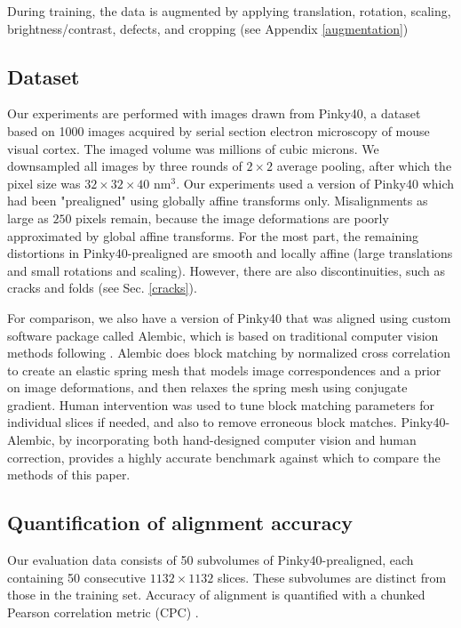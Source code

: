 \documentclass{article}
\begin{document}
During training, the data is augmented by applying translation, rotation, scaling, brightness/contrast, defects, and cropping (see Appendix \ref{augmentation}) 

\subsection{Dataset}\label{dataset}
Our experiments are performed with images drawn from Pinky40, a dataset based on 1000 images acquired by serial section electron microscopy of mouse visual cortex. The imaged volume was millions of cubic microns. We downsampled all images by three rounds of $2\times 2$ average pooling, after which the pixel size was $32\times 32\times 40$ nm$^3$. 
Our experiments used a version of Pinky40 which had been "prealigned" using globally affine transforms only. Misalignments as large as $250$ pixels remain, because the image deformations are poorly approximated by global affine transforms.  For the most part, the remaining distortions in Pinky40-prealigned are smooth and locally affine (large translations and small rotations and scaling).  However, there are also discontinuities, such as cracks and folds (see Sec. \ref{cracks}).


For comparison, we also have a version of Pinky40 that was aligned using custom software package called Alembic, which is based on traditional computer vision methods following \citet{saalfeld2012elastic}. Alembic does block matching by normalized cross correlation to create an elastic spring mesh that models image correspondences and a prior on image deformations, and then relaxes the spring mesh using conjugate gradient. Human intervention was used to tune block matching parameters for individual slices if needed, and also to remove erroneous block matches. Pinky40-Alembic, by incorporating both hand-designed computer vision and human correction, provides a highly accurate benchmark against which to compare the methods of this paper.

\subsection{Quantification of alignment accuracy}
Our evaluation data consists of 50 subvolumes of Pinky40-prealigned, each containing 50 consecutive $1132 \times 1132$ slices. These subvolumes are distinct from those in the training set. Accuracy of alignment is quantified with a chunked Pearson correlation metric (CPC) \citep{garcia2007quality}. 
\end{document}
